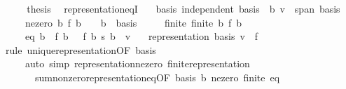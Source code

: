 \begin{isabellebody}
\ \ \isamarkupfalse%
\ \isamarkupfalse%
\ {\isacharquery}{\kern0pt}thesis\ \isacommand{{\isachardot}{\kern0pt}}\isamarkupfalse%
\isanewline
{}\isamarkupfalse%
%
\endisatagproof
{\isafoldproof}%
%
\isadelimproof
\isanewline
%
\endisadelimproof
\isanewline
{}\isamarkupfalse%
\ representation{\isacharunderscore}{\kern0pt}eqI{\isacharcolon}{\kern0pt}\isanewline
\ \ \ basis{\isacharcolon}{\kern0pt}\ {\isachardoublequoteopen}independent\ basis{\isachardoublequoteclose}\ \ b{\isacharcolon}{\kern0pt}\ {\isachardoublequoteopen}v\ {\isasymin}\ span\ basis{\isachardoublequoteclose}\isanewline
\ \ \ \ \ ne{\isacharunderscore}{\kern0pt}zero{\isacharcolon}{\kern0pt}\ {\isachardoublequoteopen}{\isasymAnd}b{\isachardot}{\kern0pt}\ f\ b\ {\isasymnoteq}\ {}\ {\isasymLongrightarrow}\ b\ {\isasymin}\ basis{\isachardoublequoteclose}\isanewline
\ \ \ \ \ finite{\isacharcolon}{\kern0pt}\ {\isachardoublequoteopen}finite\ {\isacharbraceleft}{\kern0pt}b{\isachardot}{\kern0pt}\ f\ b\ {\isasymnoteq}\ {}{\isacharbraceright}{\kern0pt}{\isachardoublequoteclose}\isanewline
\ \ \ \ \ eq{\isacharcolon}{\kern0pt}\ {\isachardoublequoteopen}{\isacharparenleft}{\kern0pt}{\isasymSum}b\ {\isacharbar}{\kern0pt}\ f\ b\ {\isasymnoteq}\ {}{\isachardot}{\kern0pt}\ f\ b\ {\isacharasterisk}{\kern0pt}s\ b{\isacharparenright}{\kern0pt}\ {\isacharequal}{\kern0pt}\ v{\isachardoublequoteclose}\isanewline
\ \ \ {\isachardoublequoteopen}representation\ basis\ v\ {\isacharequal}{\kern0pt}\ f{\isachardoublequoteclose}\isanewline
%
\isadelimproof
\ \ %
\endisadelimproof
%
\isatagproof
{}\isamarkupfalse%
\ {\isacharparenleft}{\kern0pt}rule\ unique{\isacharunderscore}{\kern0pt}representation{\isacharbrackleft}{\kern0pt}OF\ basis{\isacharbrackright}{\kern0pt}{\isacharparenright}{\kern0pt}\isanewline
\ \ \ \ \ {\isacharparenleft}{\kern0pt}auto\ simp{\isacharcolon}{\kern0pt}\ representation{\isacharunderscore}{\kern0pt}ne{\isacharunderscore}{\kern0pt}zero\ finite{\isacharunderscore}{\kern0pt}representation\isanewline
\ \ \ \ \ \ \ sum{\isacharunderscore}{\kern0pt}nonzero{\isacharunderscore}{\kern0pt}representation{\isacharunderscore}{\kern0pt}eq{\isacharbrackleft}{\kern0pt}OF\ basis\ b{\isacharbrackright}{\kern0pt}\ ne{\isacharunderscore}{\kern0pt}zero\ finite\ eq{\isacharparenright}{\kern0pt}%
\endisatagproof
{\isafoldproof}%
%
\isadelimproof
\isanewline
%
\endisadelimproof
\isanewline
{}\isamarkupfalse%

\end{isabellebody}
